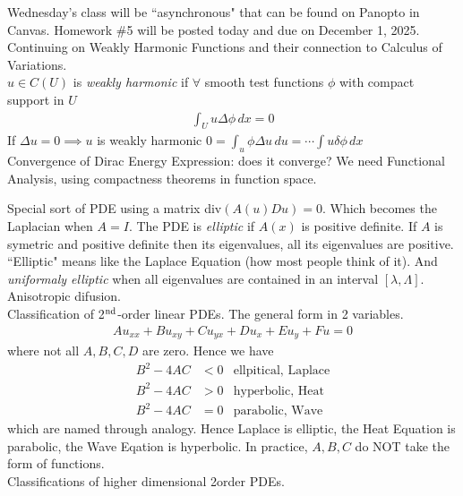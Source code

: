 \documentclass[12pt,a4paper]{report}
\begin{document}
{Wednesday's class will be ``asynchronous" that can be found on Panopto in Canvas.  Homework \#5 will be posted today and due on December 1, 2025.\\

Continuing on Weakly Harmonic Functions and their connection to Calculus of Variations.\\

$u \in C(U)$ is \textit{weakly harmonic} if $\forall$ smooth test functions $\phi$ with compact support in $U$ 
\begin{align*}
	\int_U u\Delta \phi\,dx = 0
\end{align*}If $\Delta u=0 \implies u$ is weakly harmonic $0=\int_u\phi\Delta u \, du = \cdots \int u\delta\phi\, dx$\\

Convergence of Dirac Energy Expression: does it converge? We need Functional Analysis, using compactness theorems in function space.

\HLINE
Special sort of PDE using a matrix  div$ (A(u)Du) = 0$.  Which becomes the Laplacian when $A = I$.  The PDE is \textit{elliptic} if $A(x)$ is positive definite.  If $A$ is symetric and positive definite then its eigenvalues, all its eigenvalues are positive.  ``Elliptic" means like the Laplace Equation (how most people think of it).  And \textit{uniformaly elliptic} when all eigenvalues are contained in an interval $[\lambda, \Lambda]$.\\

Anisotropic difusion.\\

\HLINE
Classification of 2$\textsuperscript{nd}$-order linear PDEs.  The general form in 2 variables.
\begin{align*}
	Au_{xx}+Bu_{xy}+Cu_{yx}+Du_{x}+Eu_y+Fu=0
\end{align*}where not all $A,B,C,D$ are zero.  Hence we have
\begin{align*}
	B^2-4AC &<0 & \text{ellpitical, Laplace} \\
	B^2-4AC &>0 & \text{hyperbolic, Heat} \\
	B^2-4AC &=0 & \text{parabolic, Wave} 
\end{align*}which are named through analogy.  Hence Laplace is elliptic, the Heat Equation is parabolic, the Wave Eqation is hyperbolic.  In practice, $A,B,C$ do NOT take the form of functions.\\

Classifications of higher dimensional 2\SND order PDEs.

}
\end{document}
